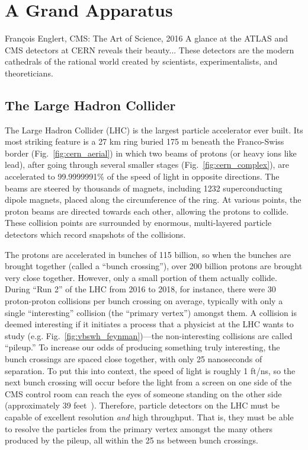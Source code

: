 \chapter{A Grand Apparatus}\label{ch:lhc_cms}
\begin{aquote}{Fran\c{c}ois Englert, CMS: The Art of Science, 2016}
    A glance at the ATLAS and CMS detectors at CERN reveals their beauty...
    These detectors are the modern cathedrals of the rational world created by scientists, experimentalists, and theoreticians. 
\end{aquote}

\section{The Large Hadron Collider}
The Large Hadron Collider (LHC) is the largest particle accelerator ever built. 
Its most striking feature is a 27 km ring buried 175 m beneath the Franco-Swiss border (Fig.~\ref{fig:cern_aerial}) in which two beams of protons (or heavy ions like lead), after going through several smaller stages (Fig.~\ref{fig:cern_complex}), are accelerated to 99.9999991\% of the speed of light in opposite directions. 
The beams are steered by thousands of magnets, including 1232 superconducting dipole magnets, placed along the circumference of the ring. 
At various points, the proton beams are directed towards each other, allowing the protons to collide. 
These collision points are surrounded by enormous, multi-layered particle detectors which record snapshots of the collisions. 

The protons are accelerated in bunches of 115 billion, so when the bunches are brought together (called a ``bunch crossing''), over 200 billion protons are brought very close together.
However, only a small portion of them actually collide. 
During ``Run 2'' of the LHC from 2016 to 2018, for instance, there were 30 proton-proton collisions per bunch crossing on average, typically with only a single ``interesting'' collision (the ``primary vertex'') amongst them. %
A collision is deemed interesting if it initiates a process that a physicist at the LHC wants to study (e.g. Fig.~\ref{fig:vbswh_feynman})---the non-interesting collisions are called ``pileup.'' 
To increase our odds of producing something truly interesting, the bunch crossings are spaced close together, with only 25 nanoseconds of separation. 
To put this into context, the speed of light is roughly 1 ft/ns, so the next bunch crossing will occur before the light from a screen on one side of the CMS control room can reach the eyes of someone standing on the other side (approximately 39 feet~\cite{CMSP5Layout}).
Therefore, particle detectors on the LHC must be capable of excellent resolution \textit{and} high throughput. 
That is, they must be able to resolve the particles from the primary vertex amongst the many others produced by the pileup, all within the 25 ns between bunch crossings. 

